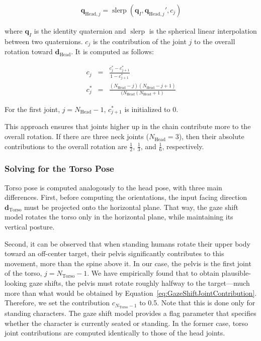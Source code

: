 \begin{align}
\label{eq:GazeShiftJointOrientation}
\mathbf{q}_{\mathrm{Head},j} = \mathop{slerp}(\mathbf{q}_I, \mathbf{q}_{\mathrm{Head},j}', c_j)
\end{align}

where $\mathbf{q}_I$ is the identity quaternion and $\mathop{slerp}$ is the spherical linear interpolation between two quaternions. $c_j$ is the contribution of the joint $j$ to the overall rotation toward $\mathbf{d}_{\mathrm{Head}}$. It is computed as follows:

\begin{align}
\label{eq:GazeShiftJointContribution}
c_j &=& \frac{c_j^* - c_{j+1}^*}{1 - c_{j+1}^*} \\
c_j^* &=& \frac{(N_{\mathrm{Head}} - j)(N_{\mathrm{Head}} - j + 1)}{(N_{\mathrm{Head}} (N_{\mathrm{Head}} + 1)}
\end{align}

For the first joint, $j = N_{\mathrm{Head}} - 1$, $c_{j+1}^*$ is initialized to 0.

This approach ensures that joints higher up in the chain contribute more to the overall rotation. If there are three neck joints ($N_{\mathrm{Head}} = 3$), then their absolute contributions to the overall rotation are $\frac{1}{2}$, $\frac{1}{3}$, and $\frac{1}{6}$, respectively.

\subsubsection{Solving for the Torso Pose}

Torso pose is computed analogously to the head pose, with three main differences. First, before computing the orientations, the input facing direction $\mathbf{d}_{\mathrm{Torso}}$ must be projected onto the horizontal plane. That way, the gaze shift model rotates the torso only in the horizontal plane, while maintaining its vertical posture.

Second, it can be observed that when standing humans rotate their upper body toward an off-center target, their pelvis significantly contributes to this movement, more than the spine above it. In our case, the pelvis is the first joint of the torso, $j = N_{\mathrm{Torso}} - 1$. We have empirically found that to obtain plausible-looking gaze shifts, the pelvis must rotate roughly halfway to the target---much more than what would be obtained by Equation~\ref{eq:GazeShiftJointContribution}. Therefore, we set the contribution $c_{N_{\mathrm{Torso}} -1}$ to 0.5. Note that this is done only for standing characters. The gaze shift model provides a flag parameter that specifies whether the character is currently seated or standing. In the former case, torso joint contributions are computed identically to those of the head joints.


